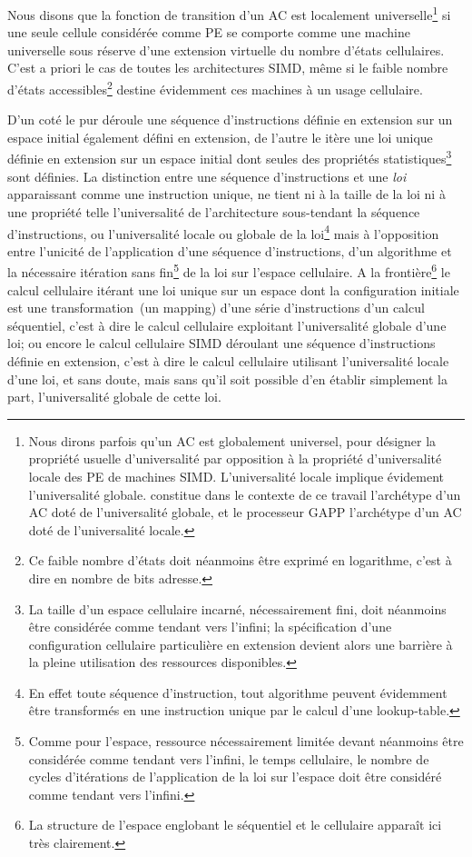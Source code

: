 Nous disons que la fonction de transition d'un AC est localement
univer\-selle\footnote{%
  Nous dirons parfois qu'un AC est globalement universel, pour
  désigner la propriété usuelle d'universalité par opposition à la
  propriété d'universalité locale des PE de machines SIMD\@. %
  L'universalité locale implique évidement l'universalité globale. %
   constitue dans le contexte de ce travail l'archétype
  d'un AC doté de l'universalité globale, et le processeur GAPP
  l'archétype d'un AC doté de l'universalité locale.} %
si une seule cellule considérée comme PE se comporte comme une machine
universelle sous réserve d'une extension virtuelle du nombre d'états
cellulaires. %
C'est a priori le cas de toutes les architectures SIMD,
même si le faible nombre d'états accessibles\footnote{%
  Ce faible nombre d'états doit néanmoins être exprimé en logarithme,
  c'est à dire en nombre de bits adresse.} %
destine évidemment ces machines à un usage cellulaire. %

D'un coté le  pur déroule une séquence
d'instructions définie en extension sur un espace initial également
défini en extension, de l'autre le 
itère une loi unique définie en extension sur un espace initial dont
seules des propriétés statistiques\footnote{%
  La taille d'un espace cellulaire incarné, nécessairement fini, doit
  néanmoins être considérée comme tendant vers l'infini; la
  spécification d'une configuration cellulaire particulière en
  extension devient alors une barrière à la pleine utilisation des
  ressources disponibles.} %
sont définies. %
La distinction entre une séquence d'instructions et une \emph{loi}
apparaissant comme une instruction unique, ne tient ni à la taille de
la loi ni à une propriété telle l'universalité de l'architecture
sous-tendant la séquence d'instructions, ou l'universalité
locale ou globale de la loi\footnote{%
  En effet toute séquence d'instruction, tout algorithme peuvent
  évidemment être transformés en une instruction
  unique par le calcul d'une lookup-table.} %
mais à l'opposition entre l'unicité de l'application d'une séquence
d'instructions, d'un algorithme et la nécessaire itération sans
fin\footnote{%
  Comme pour l'espace, ressource nécessairement limitée devant
  néanmoins être considérée comme tendant vers l'infini, le temps
  cellulaire, le nombre de cycles d'itérations de l'application de la
  loi sur l'espace doit être considéré comme tendant vers l'infini.} %
de la loi sur l'espace cellulaire. %
A la frontière\footnote{%
  La structure de l'espace englobant le séquentiel et le cellulaire
  apparaît ici très clairement.} %
le calcul cellulaire itérant une loi unique sur un espace dont la
configuration ini\-tiale est une transformation~(un mapping) d'une série
d'instructions d'un calcul séquentiel, c'est à dire le calcul
cellulaire exploitant l'universalité globale d'une loi; ou encore le
calcul cellulaire SIMD déroulant une séquence d'instructions définie
en extension, c'est à dire le calcul cellulaire utilisant
l'universalité locale d'une loi, et sans doute, mais sans qu'il soit
possible d'en établir simplement la part, l'universalité globale de
cette loi. %

